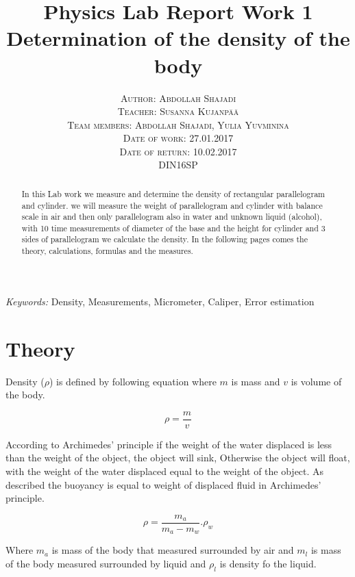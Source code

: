 \documentclass[a4paper, 12pt]{article}
\title{\textbf{Physics Lab Report Work 1}\\
	Determination of the density of the body}
\author{\textsc{Author: Abdollah Shajadi}
	\\{\textsc{Teacher: Susanna Kujanp{\"a}{\"a}}}
	\\{\textsc{Team members: Abdollah Shajadi, Yulia Yuvminina}}
	\\{\textsc{Date of work: 27.01.2017}}
	\\{\textsc{Date of return: 10.02.2017}}
	\\{\textsc{DIN16SP}}}
\makeatletter
\renewcommand{\maketitle}{ 
	\begin{flushright} 

		{\LARGE\@title} 
		
		\vspace{80pt} 
		
		{\large\@author} 
		
		\vspace{170pt} 
	\end{flushright}
}
\makeatother
\begin{document}
	
	\maketitle 
	
\clearpage

\tableofcontents

\clearpage

\renewcommand{\abstractname}{Summary} 

\begin{abstract}

In this Lab work we measure and determine the density of rectangular parallelogram and cylinder.
we will measure the weight of parallelogram and cylinder with balance scale in air and then only parallelogram also in water and unknown liquid (alcohol), with 10 time measurements of diameter of the base and the height for cylinder and 3 sides of parallelogram we calculate the density. 
In the following pages comes the theory, calculations, formulas and the measures.

\end{abstract}

\hspace*{3,6mm}\textit{Keywords:} Density, Measurements, Micrometer, Caliper, Error estimation 

\vspace{30pt}


\section{Theory}

Density (\(\rho\)) is defined by following equation where \(m\) is mass and \(v\) is volume of the body.

\[\rho = \frac{m}{v}\]

According to Archimedes' principle if the weight of the water displaced is less than the weight of the object, the object will sink, Otherwise the object will float, with the weight of the water displaced equal to the weight of the object. \cite{weber}
As described the buoyancy is equal to weight of displaced fluid in Archimedes' principle.

\[
\rho = \frac{m_{a}}{m_{a}-m_{w}}.\rho_{w}
\]

Where \(m_{a}\) is mass of the body that measured surrounded by air and \(m_{l}\) is mass of the body measured surrounded by liquid and \(\rho_{l}\) is density fo the liquid.
\end{document}
